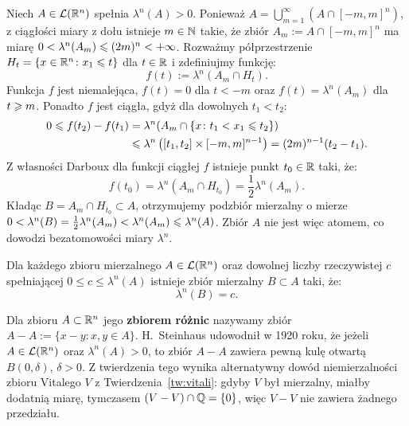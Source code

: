 \begin{dow}
    Niech $A \in \mathcal{L}({\mathbb{R}^{n}})$ spełnia $\lambda^n(A) > 0$. Ponieważ $A = \bigcup_{m=1}^\infty \left(A \cap [-m, m]^n\right)$, z ciągłości miary z dołu istnieje $m \in \mathbb{N}$ takie, że zbiór $A_m := A \cap [-m, m]^n$ ma miarę $0 < \lambda^n(A_m) \leqslant (2m)^n < +\infty$. Rozważmy półprzestrzenie $H_t = \{x \in \mathbb{R}^{n} \colon x_1 \leqslant t\}$ dla $t \in \mathbb{R}$ i zdefiniujmy funkcję:
    \begin{equation*}
        f(t) := \lambda^n(A_m \cap H_t).
    \end{equation*}
    Funkcja $f$ jest niemalejąca, $f(t) = 0$ dla $t < -m$ oraz $f(t) = \lambda^n(A_m)$ dla $t \geqslant m$. Ponadto $f$ jest ciągła, gdyż dla dowolnych $t_1 < t_2$:
    \begin{align*}
        0 \leqslant f(t_2) - f(t_1) & = \lambda^n(A_m \cap \{x \colon t_1 < x_1 \leqslant t_2\})                     \\
                               & \leqslant \lambda^n\left([t_1, t_2] \times [-m, m]^{n-1}\right) = (2m)^{n-1}(t_2 - t_1).
    \end{align*}
    Z własności Darboux dla funkcji ciągłej $f$ istnieje punkt $t_0 \in \mathbb{R}$ taki, że:
    \begin{equation*}
        f(t_0) = \lambda^n(A_m \cap H_{t_0}) = \frac{1}{2} \lambda^n(A_m).
    \end{equation*}
    Kładąc $B = A_m \cap H_{t_0} \subset A$, otrzymujemy podzbiór mierzalny o mierze $0 < \lambda^n(B) = \frac{1}{2}\lambda^n(A_m) < \lambda^n(A_m) \leqslant \lambda^n(A)$. Zbiór $A$ nie jest więc atomem, co dowodzi bezatomowości miary $\lambda^n$.
\end{dow}

\begin{wn}
    Dla każdego zbioru mierzalnego $A \in \mathcal{L}({\mathbb{R}^{n}})$ oraz dowolnej liczby rzeczywistej $c$ spełniającej $0 \le c \le \lambda^n(A)$ istnieje zbiór mierzalny $B \subset A$ taki, że:
    \begin{equation}
        \lambda^n(B) = c.
    \end{equation}
\end{wn}

\begin{uwaga}
    Dla zbioru $A \subset \mathbb{R}^{n}$ jego \textbf{zbiorem różnic} nazywamy zbiór $A - A := \{x - y \colon x, y \in A\}$. H.~Steinhaus udowodnił w 1920 roku, że jeżeli $A \in \mathcal{L}({\mathbb{R}^{n}})$ oraz $\lambda^n(A) > 0$, to zbiór $A - A$ zawiera pewną kulę otwartą $B(0, \delta)$, $\delta > 0$. Z twierdzenia tego wynika alternatywny dowód niemierzalności zbioru Vitalego $V$ z Twierdzenia~\ref{tw:vitali}: gdyby $V$ był mierzalny, miałby dodatnią miarę, tymczasem $(V - V) \cap \mathbb{Q} = \{0\}$, więc $V - V$ nie zawiera żadnego przedziału.
\end{uwaga}
